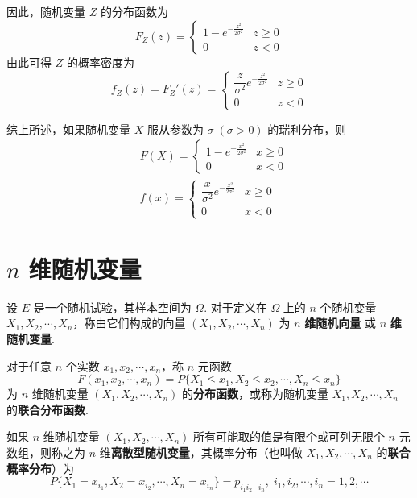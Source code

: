 因此，随机变量 $Z$ 的分布函数为
$$
F_{Z}(z) = \begin{cases}
    1 - e^{-\frac{z^2}{2 \sigma^2}} & z \geqslant 0 \\
    0 & z<0
\end{cases}
$$
由此可得 $Z$ 的概率密度为
$$
f_{Z}(z) = F_{Z}'(z) = \begin{cases}
    \dfrac{z}{\sigma^2} e^{-\frac{z^2}{2 \sigma^2}} & z \geqslant 0 \\[0.5em]
    0 & z<0
\end{cases}
$$

综上所述，如果随机变量 $X$ 服从参数为 $\sigma \; (\sigma > 0)$ 的瑞利分布，则
$$
\begin{aligned}
    & F(X) = \begin{cases}
        1 - e^{-\frac{x^2}{2 \sigma^2}} & x \geqslant 0 \\
        0 & x<0
    \end{cases} \\[0.5em]
    & f(x) = \begin{cases}
        \dfrac{x}{\sigma^2} e^{-\frac{x^2}{2 \sigma^2}} & x \geqslant 0 \\[0.5em]
        0 & x<0
    \end{cases}
\end{aligned}
$$

\section{\texorpdfstring{$n$}{} 维随机变量}

\begin{definition}
    设 $E$ 是一个随机试验，其样本空间为 $\varOmega$. 对于定义在 $\varOmega$ 上的 $n$ 个随机变量 $X_1,X_2,\cdots,X_n$，称由它们构成的向量 $(X_1,X_2,\cdots,X_n)$ 为 $n$ \textbf{维随机向量} 或 $n$ \textbf{维随机变量}.
\end{definition}

\begin{definition}
    对于任意 $n$ 个实数 $x_1,x_2,\cdots,x_n$，称 $n$ 元函数
    $$
    F(x_1,x_2,\cdots,x_n) = P\{X_1 \leqslant x_1, X_2 \leqslant x_2, \cdots, X_n \leqslant x_n\}
    $$
    为 $n$ 维随机变量 $(X_1,X_2,\cdots,X_n)$ 的\textbf{分布函数}，或称为随机变量 $X_1,X_2,\cdots,X_n$ 的\textbf{联合分布函数}.
\end{definition}

\begin{definition}
    如果 $n$ 维随机变量 $(X_1,X_2,\cdots,X_n)$ 所有可能取的值是有限个或可列无限个 $n$ 元数组，则称之为 $n$ 维\textbf{离散型随机变量}，其概率分布（也叫做 $X_1,X_2,\cdots,X_n$ 的\textbf{联合概率分布}）为
    $$
    P\{X_1 = x_{i_1}, X_2 = x_{i_2}, \cdots, X_n = x_{i_n}\} = p_{i_1 i_2 \cdots i_n}, \; i_1, i_2, \cdots, i_n = 1,2,\cdots
    $$
\end{definition}

